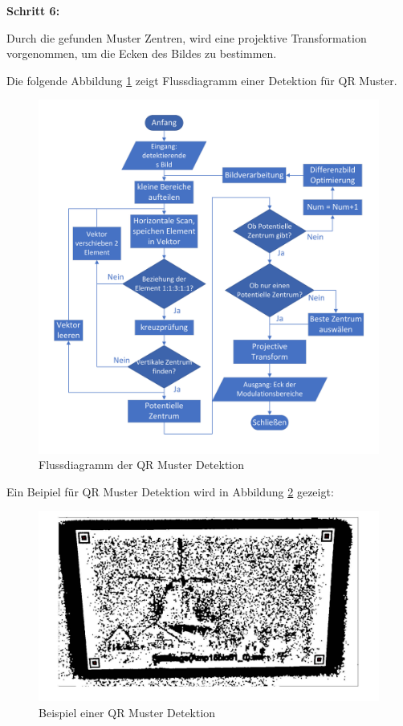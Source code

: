 \textbf{Schritt 6:}

Durch die gefunden Muster Zentren, wird eine projektive Transformation vorgenommen, um die Ecken des Bildes zu bestimmen.


Die folgende Abbildung \ref{fig:FlussdiagrammQRMuster} zeigt Flussdiagramm einer Detektion für QR Muster.

\begin{figure}[htb]
 \centering 
 \includegraphics[keepaspectratio,width=1.0\textwidth]{images/3_Ersteverfahren/QRMuster/QR_flussdiagramm.pdf}
 \caption{Flussdiagramm der QR Muster Detektion}
 \label{fig:FlussdiagrammQRMuster}
\end{figure}

Ein Beipiel für QR Muster Detektion wird in Abbildung \ref{fig:QRMusterBeispiel} gezeigt:

\begin{figure}[htb]
 \centering 
 \includegraphics[keepaspectratio,width=1.0\textwidth]{images/3_Ersteverfahren/QRMuster/QR_Patterndetektion.pdf}
 \caption{Beispiel einer QR Muster Detektion}
 \label{fig:QRMusterBeispiel}
\end{figure}